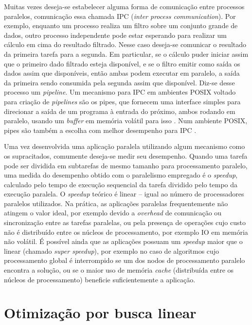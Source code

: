 \documentclass[cic,tc]{iiufrgs}
\begin{document}
Muitas vezes deseja-se estabelecer alguma forma de comunicação entre processos
paralelos, comunicação essa chamada IPC (\textit{inter process communication}).
Por exemplo, enquanto um processo realiza um filtro sobre um conjunto grande
de dados, outro processo independente pode estar esperando para realizar um
cálculo em cima do resultado filtrado. Nesse caso deseja-se comunicar o
resultado da primeira tarefa para a segunda. Em particular, se o cálculo puder
iniciar assim que o primeiro dado filtrado esteja disponível, e se o filtro
emitir como saída os dados assim que disponíveis, então ambas podem executar em
paralelo, a saída da primeira sendo consumida pela segunda assim que
disponível. Diz-se desse processo um \textit{pipeline}. Um mecanismo para IPC
em ambientes POSIX voltado para criação de \textit{pipelines} são os pipes, que
fornecem uma interface simples para direcionar a saída de um programa à entrada
do próximo, ambos rodando em paralelo, usando um \textit{buffer} em memória
volátil para isso \cite{immich2003performance}. Num ambiente POSIX, pipes são
também a escolha com melhor desempenho para IPC \cite{immich2003performance}.

Uma vez desenvolvida uma aplicação paralela utilizando algum mecanismo como os
supracitados, comumente deseja-se medir seu desempenho. Quando uma tarefa pode
ser dividida em subtarefas de mesmo tamanho para processamento paralelo, uma
medida do desempenho obtido com o paralelismo empregado é o \textit{speedup},
calculado pelo tempo de execução sequencial da tarefa dividido pelo tempo da
execução paralela. O \textit{speedup} teórico é linear -- igual ao número de
processadores paralelos utilizados. Na prática, as aplicações paralelas
frequentemente não atingem o valor ideal, por exemplo devido a
\textit{overhead} de comunicação ou sincronização entre as tarefas paralelas,
ou pela presença de operações cujo custo não é distribuído entre os núcleos de
processamento, por exemplo IO em memória não volátil. É possível ainda que as
aplicações possuam um \textit{speedup} maior que o linear (chamado
\textit{super speedup}), por exemplo no caso de algoritmos cujo processamento
global é interrompido se um dos nodos de processamento paralelo encontra a
solução, ou se o maior uso de memória \textit{cache} (distribuída entre os
núcleos de processamento) beneficie suficientemente a aplicação.

\section{Otimização por busca linear}
\label{sec:bfgs}
\end{document}
